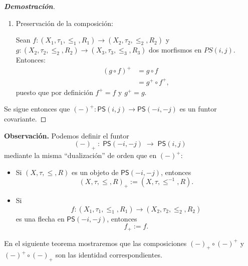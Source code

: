 \documentclass[12pt]{book}
\newcommand{\PS}{\mathsf{PS}}
\begin{document}
\begin{proof}[\textbf{Demostración}]
\begin{enumerate}
\medskip
\item Preservación de la composición:

Sean $f\colon (X_1,\tau_1,\le_1,R_1)\to (X_2,\tau_2,\le_2,R_2)$ y 
$g\colon (X_2,\tau_2,\le_2,R_2)\to (X_3,\tau_3,\le_3,R_3)$ dos morfismos en $PS(i,j)$. Entonces:
\begin{align*}
(g\circ f)^{+} &= g\circ f\\
&= g^{+} \circ f^{+},
\end{align*}
puesto que por definición $f^{+} = f$ y $g^{+} = g$.
\end{enumerate}

Se sigue entonces que $(-)^{+} \colon \PS(i,j) \to \PS(-i,-j)$ es un funtor covariante. 
\end{proof}

\smallskip


\noindent\textbf{Observación.} Podemos definir el funtor 
\[
(-)_{+}\;\colon\;\PS(-i,-j)\;\longrightarrow\;\PS(i,j)
\]
mediante la misma “dualización” de orden que en $(-)^{+}$:

\begin{itemize}
  \item Si \((X,\tau,\le,R)\) es un objeto de \(\PS(-i,-j)\), entonces
  \[
    (X,\tau,\le,R)_{+} := (X,\tau,\le^{-1},R).
  \]
  \item Si 
  \[
    f\colon (X_1,\tau_1,\le_1,R_1)\to (X_2,\tau_2,\le_2,R_2)
  \]
  es una flecha en \(\PS(-i,-j)\), entonces
  \[
    f_{+} := f.
  \]
\end{itemize}

En el siguiente teorema mostraremos que las composiciones
\((-)_{+}\circ(-)^{+}\) y \((-)^{+}\circ(-)_{+}\) son las identidad correspondientes.



\bigskip
\end{document}
